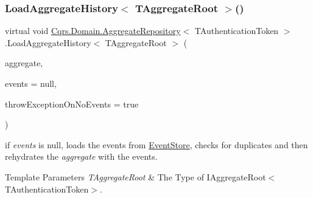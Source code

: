 \subsubsection{\texorpdfstring{Load\+Aggregate\+History$<$ T\+Aggregate\+Root $>$()}{LoadAggregateHistory< TAggregateRoot >()}}
{\footnotesize\ttfamily virtual void \hyperlink{classCqrs_1_1Domain_1_1AggregateRepository}{Cqrs.\+Domain.\+Aggregate\+Repository}$<$ T\+Authentication\+Token $>$.Load\+Aggregate\+History$<$ T\+Aggregate\+Root $>$ (\begin{DoxyParamCaption}\item[{T\+Aggregate\+Root}]{aggregate,  }\item[{I\+List$<$ \hyperlink{interfaceCqrs_1_1Events_1_1IEvent}{I\+Event}$<$ T\+Authentication\+Token $>$$>$}]{events = {\ttfamily null},  }\item[{bool}]{throw\+Exception\+On\+No\+Events = {\ttfamily true} }\end{DoxyParamCaption})\hspace{0.3cm}{\ttfamily [virtual]}}



if {\itshape events}  is null, loads the events from \hyperlink{namespaceCqrs_1_1EventStore}{Event\+Store}, checks for duplicates and then rehydrates the {\itshape aggregate}  with the events. 


\begin{DoxyTemplParams}{Template Parameters}
{\em T\+Aggregate\+Root} & The Type of I\+Aggregate\+Root$<$\+T\+Authentication\+Token$>$.\\
\hline
\end{DoxyTemplParams}

